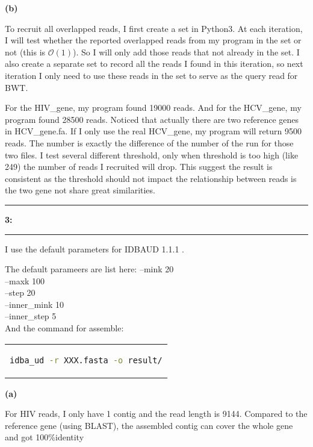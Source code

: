 \documentclass[11pt]{article}
\newcommand\question[2]{\vspace{.25in}\hrule\textbf{#1: #2}\vspace{.5em}\hrule\vspace{.10in}}
\renewcommand\part[1]{\vspace{.10in}\textbf{(#1)}}
\begin{document}
\part{b}

To recruit all overlapped reads, I first create a set in Python3. At each iteration, I will test whether the reported overlapped reads from my program in the set or not (this is $ \mathcal{O}(1) $). So I will only add those reads that not already in the set. I also create a separate set to record all the reads I found in this iteration, so next iteration I only need to use these reads in the set to serve as the query read for BWT.

For the HIV\_gene, my program found 19000 reads. And for the HCV\_gene, my program found 28500 reads. Noticed that actually there are two reference genes in HCV\_gene.fa. If I only use the real HCV\_gene, my program will return 9500 reads. The number is exactly the difference of the number of the run for those two files. I test several different threshold, only when threshold is too high (like 249) the number of reads I recruited will drop. This suggest the result is consistent as the threshold should not impact the relationship between reads is the two gene not share great similarities.




\question{3}{}

I use the default parameters for IDBAUD 1.1.1 .

The default parameers are list here:
--mink 20\\
--maxk 100\\
--step 20\\
--inner\_mink 10\\
--inner\_step 5\\


And the command for assemble:
\begin{center}
	\begin{tabular}{c}
		\begin{lstlisting}[language=bash]
		idba_ud -r XXX.fasta -o result/
		\end{lstlisting}
	\end{tabular}
\end{center}

\part{a}

For HIV reads, I only have 1 contig and the read length is 9144. Compared to the reference gene (using BLAST), the assembled contig can cover the whole gene and got 100\%identity
\end{document}
